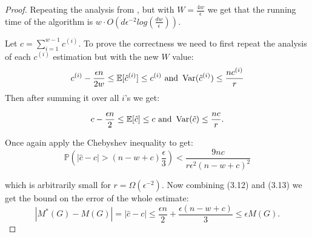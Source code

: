 \begin{proof}
    Repeating the analysis from , but with $W = \frac{4w}{\epsilon}$ we get that the running time of the algorithm is $w \cdot O(d\epsilon^{-2}log(\frac{dw}{\epsilon}))$.

    Let $c = \sum\limits_{i = 1}^{w -1} c^{(i)}$.
    To prove the correctness we need to first repeat the analysis of each $c^{(i)}$ estimation but with the new $W$ value: 
    \begin{equation*}
        c^{(i)} - \frac{\epsilon n}{2 w} \leq \mathbb{E}[\hat{c}^{(i)}] \leq c^{(i)} \textrm{ and } \operatorname{\mathrm{Var}}(\hat{c}^{(i)}) \leq \frac{nc^{(i)}}{r} 
    \end{equation*}
    Then after summing it over all $i$'s we get:

    \begin{equation}
     c - \frac{\epsilon n}{2} \leq \mathbb{E}[\hat{c}] \leq c\textrm{ and }\operatorname{\mathrm{Var}}(\hat{c}) \leq \frac{nc}{r}.   
    \end{equation}

    Once again apply the Chebyshev inequality to get: 
    \begin{equation}
     \mathbb{P}\left(|\hat{c} - c| > (n - w + c)\frac\epsilon3\right) < \frac{9nc}{r\epsilon^2(n-w+c)^2}   
    \end{equation}
    
    which is arbitrarily small for $r = \Omega(\epsilon^{-2})$. Now combining (3.12) and (3.13) we get the bound on the error of the whole estimate:
    \begin{equation*}
     |M^*(G) - M(G)| = |\hat{c} - c| \leq \frac{\epsilon n}{2} + \frac{\epsilon (n - w +c)}{3} \leq \epsilon M(G).   
    \end{equation*}
\end{proof}
